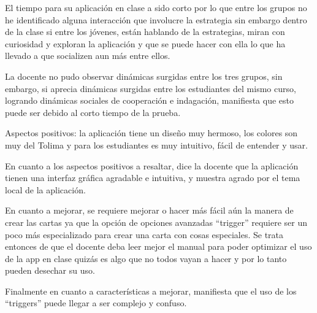 \begin{displayquote}
	El tiempo para su aplicación en clase a sido corto por lo que entre los grupos no he identificado 
	alguna interacción que involucre la estrategia sin embargo dentro de la clase si entre los jóvenes, 
	están hablando de la estrategias, miran con curiosidad y exploran la aplicación y que se puede hacer
	con ella lo que ha llevado a que socializen aun más entre ellos.
\end{displayquote}

La docente no pudo observar dinámicas surgidas entre los tres grupos, sin embargo, si aprecia dinámicas 
surgidas entre los estudiantes del mismo curso, logrando dinámicas sociales de cooperación e indagación, 
manifiesta que esto puede ser debido al corto tiempo de la prueba.

\begin{displayquote}
	Aspectos positivos: la aplicación tiene un diseño muy hermoso, los colores son muy del Tolima y para 
	los estudiantes es muy intuitivo, fácil de entender y usar. 
\end{displayquote}

En cuanto a los aspectos positivos a resaltar, dice la docente que la aplicación tienen una interfaz gráfica 
agradable e intuitiva, y muestra agrado por el tema local de la aplicación.

\begin{displayquote}
	En cuanto a mejorar, se requiere mejorar o hacer más fácil aún la manera de crear las cartas ya que la 
	opción de opciones avanzadas ``trigger'' requiere ser un poco más especializado para crear una carta 
	con cosas especiales. Se trata entonces de que el docente deba leer mejor el manual para poder 
	optimizar el uso de la app en clase quizás es algo que no todos vayan a hacer y por lo tanto pueden 
	desechar su uso.
\end{displayquote}

Finalmente en cuanto a características a mejorar, manifiesta que el uso de los ``triggers'' puede llegar a ser 
complejo y confuso.
